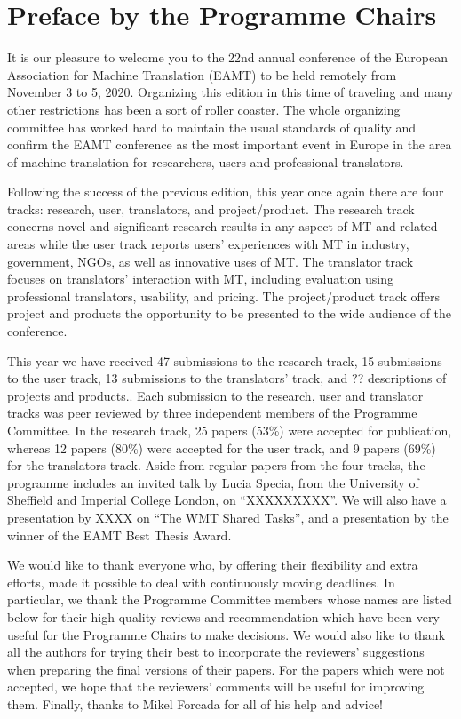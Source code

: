 \documentclass[a4paper,11pt,twoside]{book}
\begin{document}
\chapter*{Preface by the Programme Chairs}

It is our pleasure to welcome you to the 22nd annual conference of the European Association for Machine Translation (EAMT) to be held remotely from November 3 to 5, 2020. Organizing this edition in this time of traveling and many other restrictions has been a sort of roller coaster. The whole organizing committee has worked hard to maintain the usual standards of quality and confirm the EAMT conference as the most important event in Europe in the area of machine translation for researchers, users and professional translators.

Following the success of the previous edition, this year once again there are four tracks: research, user, translators, and project/product. The research track concerns novel and significant research results in any aspect of MT and related areas while the user track reports users’ experiences with MT in industry, government, NGOs, as well as innovative uses of MT. The translator track focuses on translators’ interaction with MT, including evaluation using professional translators, usability, and pricing. The project/product track offers project and products the opportunity to be presented to the wide audience of the conference.

This year we have received 47 submissions to the research track, 15 submissions to the
user track, 13 submissions to the translators’ track, and ?? descriptions of projects and products.. Each submission to the research, user and translator tracks was peer reviewed by three independent members of the Programme Committee. In the research track, 25 papers (53\%) were accepted for publication, whereas 12 papers (80\%) were accepted for the user track, and 9 papers (69\%) for the translators track. 
Aside from regular papers from the four tracks, the programme includes an invited talk by Lucia Specia, from the University of Sheffield and Imperial College London, on “XXXXXXXXX”. We will also have a presentation by XXXX on “The WMT Shared Tasks”, and a presentation by the winner of the EAMT Best Thesis Award.

We would like to thank everyone who, by offering their flexibility and extra efforts, made it possible to deal with continuously moving deadlines. In particular, we thank the Programme Committee members whose names are listed below for their high-quality reviews and recommendation which have been very useful for the Programme Chairs to make decisions. We would also like to thank all the authors for trying their best to incorporate the reviewers’ suggestions when preparing the final versions of their papers. For the papers which were not accepted, we hope that the reviewers’ comments will be useful for improving them. Finally, thanks to Mikel Forcada for all of his help and advice!
\end{document}
